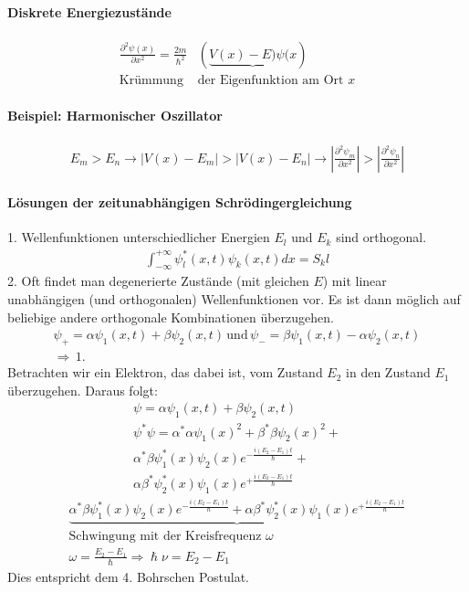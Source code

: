 \documentclass[10pt,a4paper]{article}
\begin{document}
\paragraph{Diskrete Energiezustände}
\begin{align}
\frac{\partial^2 \psi(x)}{\partial x^2} = \frac{2m}{\hslash^2}&(\underbrace{V(x) - E)\psi(x})\\
\text{Krümmung }&\text{der Eigenfunktion am Ort }x
\end{align}
\paragraph{Beispiel: Harmonischer Oszillator}
\begin{align}
E_m>E_n\rightarrow|V(x)-E_m|>|V(x)-E_n|\rightarrow |\frac{\partial^2\psi_m}{\partial x^2}|>|\frac{\partial^2\psi_n}{\partial x^2}|
\end{align}
\paragraph{Lösungen der zeitunabhängigen Schrödingergleichung}$\,$\\
1. Wellenfunktionen unterschiedlicher Energien $E_l$ und $E_k$ sind orthogonal.
\begin{align}
\int_{-\infty}^{+\infty} \psi^*_l(x,t) \psi_k(x,t)dx= S_kl
\end{align}
2. Oft findet man degenerierte Zustände (mit gleichen $E$) mit linear unabhängigen (und orthogonalen) Wellenfunktionen vor. Es ist dann möglich auf beliebige andere orthogonale Kombinationen überzugehen.
\begin{align}
\psi_+ = \alpha \psi_1(x,t) + \beta \psi_2(x,t)\, \text{und} \,\psi_- = \beta \psi_1(x,t) - \alpha \psi_2(x,t)\\
\Rightarrow\, 1.
\end{align}
Betrachten wir ein Elektron, das dabei ist, vom Zustand $E_2$ in den Zustand $E_1$ überzugehen. Daraus folgt:
\begin{align}
\psi = \alpha \psi_1(x,t) + \beta \psi_2(x,t) \\
\psi^*\psi = \alpha^*\alpha\psi_1(x)^2 + \beta^*\beta \psi_2(x)^2 +\\ \alpha^*\beta\psi_1^*(x)\psi_2(x)e^{-\frac{i(E_2-E_1)t}{\hslash}}+\\ \alpha\beta^*\psi_2^*(x)\psi_1(x)e^{+\frac{i(E_2-E_1)t}{\hslash}}
\end{align}
\begin{align}
\underbrace{\alpha^*\beta\psi_1^*(x)\psi_2(x)e^{-\frac{i(E_2-E_1)t}{\hslash}}+ \alpha\beta^*\psi_2^*(x)\psi_1(x)e^{+\frac{i(E_2-E_1)t}{\hslash}}}\\ \text{Schwingung mit der Kreisfrequenz }\omega\\
\omega = \frac{E_2-E_1}{\hslash} \Rightarrow \hslash\nu=E_2-E_1
\end{align}
Dies entspricht dem 4. Bohrschen Postulat.
\end{document}
